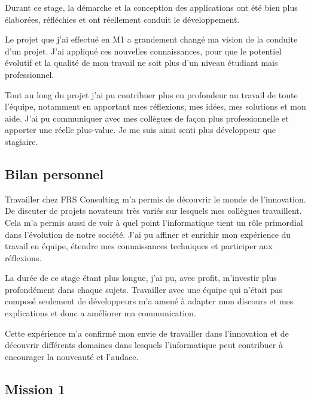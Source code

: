 \documentclass[french]{article}
\begin{document}
{Durant ce stage, la démarche et la conception des applications ont été bien plus élaborées, réfléchies et ont réellement conduit le développement.

Le projet que j'ai effectué en M1 a grandement changé ma vision de la conduite d'un projet. J'ai appliqué ces nouvelles connaissances, pour que le potentiel évolutif et la qualité de mon travail ne soit plus d'un niveau étudiant mais professionnel.

Tout au long du projet j'ai pu contribuer plus en profondeur au travail de toute l'équipe, notamment en apportant mes réflexions, mes idées, mes solutions et mon aide. J'ai pu communiquer avec mes collègues de façon plus professionnelle et apporter une réelle plus-value. Je me suis ainsi senti plus développeur que stagiaire.

\subsection{Bilan personnel}

Travailler chez FRS Consulting m'a permis de découvrir le monde de l'innovation. De discuter de projets novateurs très variés sur lesquels mes collègues travaillent. Cela m'a permis aussi de voir à quel point l'informatique tient un rôle primordial dans l'évolution de notre société. J'ai pu affiner et enrichir mon expérience du travail en équipe, étendre mes connaissances techniques et participer aux réflexions.

La durée de ce stage étant plus longue, j'ai pu, avec profit, m'investir plus profondément dans chaque sujets. Travailler avec une équipe qui n'était pas composé seulement de développeurs m'a amené à adapter mon discours et mes explications et donc a améliorer ma communication.

Cette expérience m'a confirmé mon envie de travailler dans l'innovation et de découvrir différents domaines dans lesquels l'informatique peut contribuer à encourager la nouveauté et l'audace.

\clearpage

\printbibliography[
heading=bibintoc,
title={Bibliographie}
]

\clearpage

\printglossaries

\newpage

\begin{appendices}

\section{Mission 1}

\end{appendices}}
\end{document}
